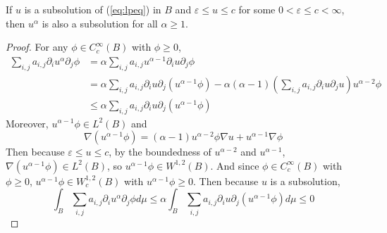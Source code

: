 \begin{lem}
	If $u$ is a subsolution of (\ref{eq:lpeq}) in $B$ and $\varepsilon \leq u \leq c$ for some $0 < \varepsilon \leq c < \infty$, then $u^\alpha$ is also a subsolution for all $\alpha \geq 1$.
\end{lem}
\begin{proof}
	For any $\phi \in C_c^\infty(B)$ with $\phi \geq 0$,
	\begin{equation*}
		\begin{aligned}
			\sum_{i, j} a_{i, j} \partial_i u^\alpha \partial_j \phi & =\alpha \sum_{i, j} a_{i, j} u^{\alpha-1} \partial_i u \partial_j \phi \\
			& =\alpha \sum_{i, j} a_{i, j} \partial_i u \partial_j\left(u^{\alpha-1} \phi\right) -\alpha(\alpha-1)\left(\sum_{i, j} a_{i, j} \partial_i u \partial_j u\right) u^{\alpha-2} \phi \\
			&\leq \alpha \sum_{i, j} a_{i, j} \partial_i u \partial_j\left(u^{\alpha-1} \phi\right)
		\end{aligned}
	\end{equation*}
	Moreover, $u^{\alpha-1} \phi \in L^2(B)$ and
	\begin{equation*}
		\nabla\left(u^{\alpha-1} \phi\right)=(\alpha-1) u^{\alpha-2} \phi \nabla u+u^{\alpha-1} \nabla \phi
	\end{equation*}
	Then because $\varepsilon \leq u \leq c$, by the boundedness of $u^{\alpha-2}$ and $u^{\alpha-1}$, $\nabla\left(u^{\alpha-1} \phi\right) \in L^2(B)$, so $u^{\alpha-1} \phi \in W^{1,2}(B)$. And since $\phi \in C_c^\infty(B)$ with $\phi \geq 0$, $u^{\alpha-1}\phi \in W_c^{1,2}(B)$ with $u^{\alpha-1}\phi \geq 0$. Then because $u$ is a subsolution,
	\begin{equation*}
		\int_B \sum_{i, j} a_{i, j} \partial_i u^\alpha \partial_j \phi d \mu \leq \alpha \int_B \sum_{i, j} a_{i, j} \partial_i u \partial_j\left(u^{\alpha-1} \phi\right) d \mu \leq 0
	\end{equation*}
\end{proof}

